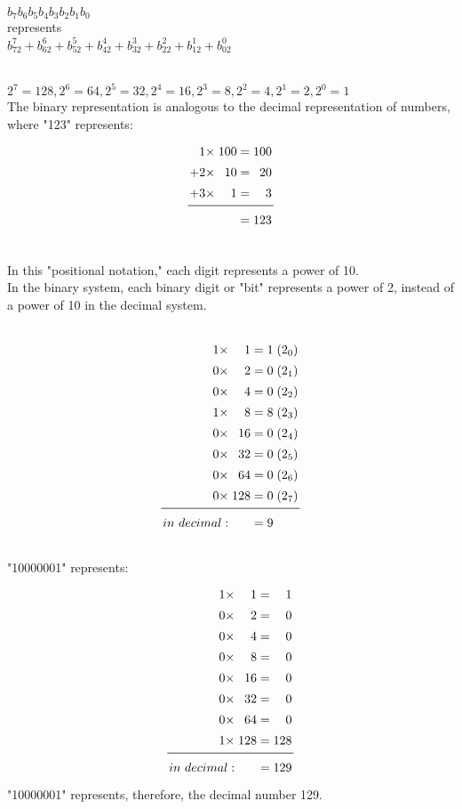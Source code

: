 \documentclass[12pt]{book}
\begin{document}
\begin{center}
\(b_7 b_6 b_5 b_4 b_3 b_2 b_1 b_0\)\\
represents\\
\(b_72^7 + b_62^6 + b_52^5 + b_42^4 + b_32^3 + b_22^2 + b_12^1 + b_02^0\)\\
\end{center}

\\

\(2^7 = 128, 2^6 = 64, 2^5 = 32, 2^4 = 16, 2^3 = 8, 2^2 = 4, 2^1 = 2, 2^0 = 1\)\\

The binary representation is analogous to the decimal representation of numbers, where "123" represents:\\
\[\renewcommand\arraystretch{1.4}
	\arraycolsep=1.4pt
\begin{array}{rrr}
1 \times& 100 =& 100 \\
+ 2 \times& 10 =& 20 \\
+ 3 \times& 1 =& 3\\\midrule
&=& 123
\end{array}
\]

\\
In this "positional notation," each digit represents a power of 10.\\
In the binary system, each binary digit or "bit" represents a power of 2, instead of a power of 10 in the decimal system.\\

\\
\[\renewcommand\arraystretch{1.4}
	\arraycolsep=1.4pt
\begin{array}{rrrr}
1 \times& 1 =& 1 & (2_0)\\
0 \times& 2 =& 0 & (2_1)\\
0 \times& 4 =& 0 & (2_2)\\
1 \times& 8 =& 8 & (2_3)\\
0 \times& 16 =& 0 & (2_4)\\
0 \times& 32 =& 0 & (2_5)\\
0 \times& 64 =& 0 & (2_6)\\
0 \times& 128 =& 0 & (2_7)\\\midrule
in\ decimal: &=& 9 &
\end{array}
\]
\\
"10000001" represents:
\[\renewcommand\arraystretch{1.4}
	\arraycolsep=1.4pt
\begin{array}{rrr}
1 \times& 1 =& 1 \\
0 \times& 2 =& 0 \\
0 \times& 4 =& 0 \\
0 \times& 8 =& 0 \\
0 \times& 16 =& 0 \\
0 \times& 32 =& 0 \\
0 \times& 64 =& 0 \\
1 \times& 128 =& 128 \\\midrule
in\ decimal: &= & 129
\end{array}
\]
"10000001" represents, therefore, the decimal number 129.
\end{document}
